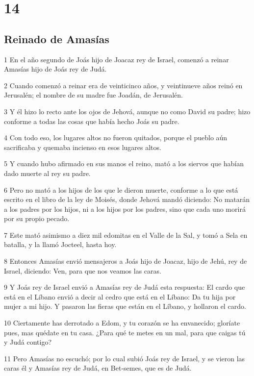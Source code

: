 \chapter{14}

\section*{Reinado de Amasías}

\par 1 En el año segundo de Joás hijo de Joacaz rey de Israel, comenzó a reinar Amasías hijo de Joás rey de Judá.
\par 2 Cuando comenzó a reinar era de veinticinco años, y veintinueve años reinó en Jerusalén; el nombre de su madre fue Joadán, de Jerusalén.
\par 3 Y él hizo lo recto ante los ojos de Jehová, aunque no como David su padre; hizo conforme a todas las cosas que había hecho Joás su padre.
\par 4 Con todo eso, los lugares altos no fueron quitados, porque el pueblo aún sacrificaba y quemaba incienso en esos lugares altos.
\par 5 Y cuando hubo afirmado en sus manos el reino, mató a los siervos que habían dado muerte al rey su padre.
\par 6 Pero no mató a los hijos de los que le dieron muerte, conforme a lo que está escrito en el libro de la ley de Moisés, donde Jehová mandó diciendo: No matarán a los padres por los hijos, ni a los hijos por los padres, sino que cada uno morirá por su propio pecado. 
\par 7 Este mató asimismo a diez mil edomitas en el Valle de la Sal, y tomó a Sela en batalla, y la llamó Jocteel, hasta hoy.
\par 8 Entonces Amasías envió mensajeros a Joás hijo de Joacaz, hijo de Jehú, rey de Israel, diciendo: Ven, para que nos veamos las caras.
\par 9 Y Joás rey de Israel envió a Amasías rey de Judá esta respuesta: El cardo que está en el Líbano envió a decir al cedro que está en el Líbano: Da tu hija por mujer a mi hijo. Y pasaron las fieras que están en el Líbano, y hollaron el cardo.
\par 10 Ciertamente has derrotado a Edom, y tu corazón se ha envanecido; gloríate pues, mas quédate en tu casa. ¿Para qué te metes en un mal, para que caigas tú y Judá contigo?
\par 11 Pero Amasías no escuchó; por lo cual subió Joás rey de Israel, y se vieron las caras él y Amasías rey de Judá, en Bet-semes, que es de Judá.
